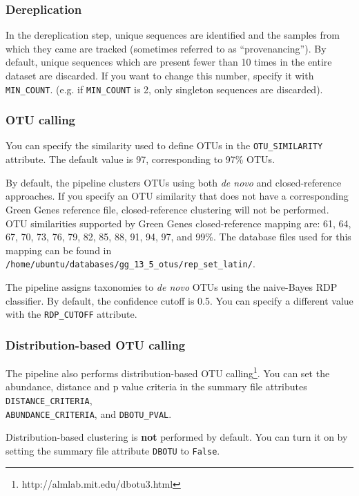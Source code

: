 \documentclass[11pt, oneside]{article}   	%
\begin{document}
\subsubsection{Dereplication}

In the dereplication step, unique sequences are identified and the
samples from which they came are tracked (sometimes referred to as 
``provenancing''). By default, unique sequences which are present fewer
than 10 times in the entire dataset are discarded. If you want to change
this number, specify it with \texttt{MIN\_COUNT}.  (e.g. if \texttt{MIN\_COUNT}
is 2, only singleton sequences are discarded).

\subsubsection{OTU calling}

You can specify the similarity used to define OTUs in the \texttt{OTU\_SIMILARITY}
attribute. The default value is 97, corresponding to 97\% OTUs.

By default, the pipeline clusters OTUs using both \textit{de novo} and closed-reference
approaches. If you specify an OTU similarity that does not have a corresponding
Green Genes reference file, closed-reference clustering will not be performed. 
OTU similarities supported by Green Genes closed-reference mapping are: 61, 64, 67, 70, 73, 76, 79, 82, 85, 88, 91, 94, 97, and 99\%. 
The database files used for this mapping can be found in \texttt{/home/ubuntu/databases/gg\_13\_5\_otus/rep\_set\_latin/}.

The pipeline assigns taxonomies to \textit{de novo} OTUs using the naive-Bayes RDP
classifier. By default, the confidence cutoff is 0.5. You can specify a different
value with the \texttt{RDP\_CUTOFF} attribute.

\subsubsection{Distribution-based OTU calling}

The pipeline also performs distribution-based OTU calling\footnote{http://almlab.mit.edu/dbotu3.html}. 
You can set the abundance, distance and p value criteria
in the summary file attributes \texttt{DISTANCE\_CRITERIA}, \\
\texttt{ABUNDANCE\_CRITERIA}, and \texttt{DBOTU\_PVAL}.

Distribution-based clustering is \textbf{not} performed by default. 
You can turn it on by setting the summary file attribute \texttt{DBOTU} to \texttt{False}.
\end{document}
